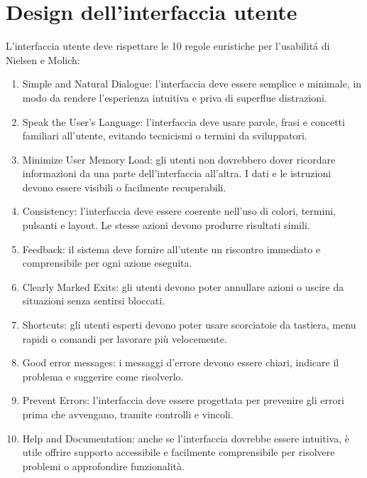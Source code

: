 \section{Design dell'interfaccia utente}
L'interfaccia utente deve rispettare le 10 regole euristiche per l'usabilitá
di Nielsen e Molich:
\begin{enumerate}
    \item Simple and Natural Dialogue: l'interfaccia deve essere semplice e minimale, in modo da rendere l'esperienza
    intuitiva e priva di superflue distrazioni.
    \item Speak the User's Language: l'interfaccia deve usare parole, frasi e concetti familiari all'utente, 
    evitando tecnicismi o termini da sviluppatori.
    \item Minimize User Memory Load: gli utenti non dovrebbero dover ricordare informazioni da una parte 
    dell'interfaccia all'altra. I dati e le istruzioni devono essere visibili 
    o facilmente recuperabili.
    \item Consistency: l'interfaccia deve essere coerente nell'uso di colori, termini, pulsanti e layout. 
    Le stesse azioni devono produrre risultati simili.
    \item Feedback: il sistema deve fornire all'utente un riscontro immediato e comprensibile 
    per ogni azione eseguita.
    \item Clearly Marked Exits: gli utenti devono poter annullare azioni o uscire da situazioni senza sentirsi bloccati.
    \item Shortcuts: gli utenti esperti devono poter usare scorciatoie da tastiera, menu rapidi o comandi 
    per lavorare più velocemente.
    \item Good error messages: i messaggi d'errore devono essere chiari, indicare il problema e suggerire come risolverlo.
    \item Prevent Errors: l'interfaccia deve essere progettata per prevenire gli errori prima che avvengano, tramite controlli e vincoli.
    \item Help and Documentation: anche se l'interfaccia dovrebbe essere intuitiva, è utile offrire supporto accessibile e facilmente comprensibile 
    per risolvere problemi o approfondire funzionalità.
\end{enumerate}